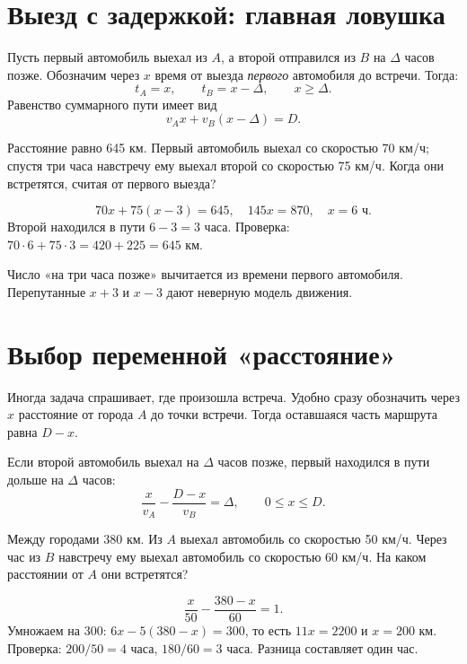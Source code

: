 \documentclass[a4paper,11pt]{article}
\newcommand{\warning}[1]{\par\noindent{\color{darkaccent}\bfseries Проверьте.} #1\par}
\newcommand{\example}[1]{\par\noindent{\color{darkaccent}\bfseries Пример.} #1\par}
\begin{document}
\section{Выезд с задержкой: главная ловушка}
Пусть первый автомобиль выехал из $A$, а второй отправился из $B$ на $\Delta$ часов позже. Обозначим через $x$ время от выезда \emph{первого} автомобиля до встречи. Тогда:
\[
 t_A=x,\qquad t_B=x-\Delta,\qquad x\geq\Delta.
\]
Равенство суммарного пути имеет вид
\[
 \boxed{v_Ax+v_B(x-\Delta)=D}.
\]
\example{Расстояние равно 645 км. Первый автомобиль выехал со скоростью 70 км/ч; спустя три часа навстречу ему выехал второй со скоростью 75 км/ч. Когда они встретятся, считая от первого выезда?}
\[
70x+75(x-3)=645,\quad 145x=870,\quad \boxed{x=6\text{ ч}}.
\]
Второй находился в пути $6-3=3$ часа. Проверка: $70\cdot6+75\cdot3=420+225=645$ км.
\warning{Число «на три часа позже» вычитается из времени первого автомобиля. Перепутанные $x+3$ и $x-3$ дают неверную модель движения.}

\section{Выбор переменной «расстояние»}
Иногда задача спрашивает, где произошла встреча. Удобно сразу обозначить через $x$ расстояние от города $A$ до точки встречи. Тогда оставшаяся часть маршрута равна $D-x$.

Если второй автомобиль выехал на $\Delta$ часов позже, первый находился в пути дольше на $\Delta$ часов:
\[
 \boxed{\frac{x}{v_A}-\frac{D-x}{v_B}=\Delta},\qquad 0\leq x\leq D.
\]
\example{Между городами 380 км. Из $A$ выехал автомобиль со скоростью 50 км/ч. Через час из $B$ навстречу ему выехал автомобиль со скоростью 60 км/ч. На каком расстоянии от $A$ они встретятся?}
\[
\frac{x}{50}-\frac{380-x}{60}=1.
\]
Умножаем на 300: $6x-5(380-x)=300$, то есть $11x=2200$ и $\boxed{x=200\text{ км}}$.
Проверка: $200/50=4$ часа, $180/60=3$ часа. Разница составляет один час.
\end{document}
